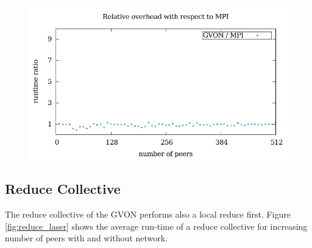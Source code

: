 \begin{figure}[H]
\begin{minipage}[t]{0.5\textwidth}
    \includegraphics[width=\textwidth]{plots/50_collective_network_overhead_gvon_laser}
  \end{minipage}%
  \caption{ }
  \label{fig:gather_laser}
\end{figure}

\subsection*{Reduce Collective}
The reduce collective of the GVON performs also a local reduce first.
Figure \ref{fig:reduce_laser} shows the average run-time of a reduce
collective for increasing number of peers with and without network.

